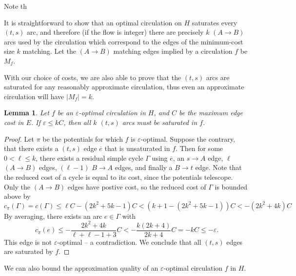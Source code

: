 \documentclass[11pt]{article}
\def\eps{\varepsilon}
\theoremstyle{plain}
\newtheorem{lemma}{Lemma}
\begin{document}
Note th

It is straightforward to show that an optimal circulation on $H$ saturates 
every $(t, s)$ arc, and therefore (if the flow is integer) there are precisely
$k$ $(A \to B)$ arcs used by the circulation which correspond to the edges
of the minimum-cost size $k$ matching.
Let the $(A \to B)$ matching edges implied by a circulation $f$ be $M_f$.

With our choice of costs, we are also able to prove that the $(t, s)$ arcs are
saturated for any reasonably approximate circulation, thus even an approximate
circulation will have $|M_f| = k$.

\begin{lemma}
\label{lemma:ts_saturated}
	Let $f$ be an $\eps$-optimal circulation in $H$, and $C$ be the maximum 
	edge cost in $E$.
	If $\eps \leq kC$, then all $k$ $(t, s)$ arcs must be saturated in $f$.
\end{lemma}
\begin{proof}
	Let $\pi$ be the potentials for which $f$ is $\eps$-optimal.
	Suppose the contrary, that there exists a $(t, s)$ edge $\overline{e}$ 
	that is unsaturated in $f$.
	Then for some $0 < \ell \leq k$, there exists a residual simple cycle 
	$\Gamma$ using $\overline{e}$, an $s \to A$ edge, 
	$\ell$ $(A \to B)$ edges, $(\ell-1)$ $B \to A$ edges, and finally a 
	$B \to t$ edge.
	Note that the reduced cost of a cycle is equal to its cost, since the 
	potentials telescope.
	Only the $(A \to B)$ edges have postive cost, 
	so the reduced cost of $\Gamma$ is bounded above by
	\begin{equation*}
		c_\pi(\Gamma) = c(\Gamma) 
			\leq \ell C - (2k^2 + 5k - 1)C 
			< (k+1 - (2k^2 + 5k - 1))C 
			< - (2k^2 + 4k) C
	\end{equation*}
	By averaging, there exists an arc $e \in \Gamma$ with
	\begin{equation*}
		c_\pi(e) \leq -\frac{2k^2 + 4k}{\ell + \ell-1 + 3} C
			< -\frac{k(2k + 4)}{2k + 4} C
			= -kC
			\leq -\eps.
	\end{equation*}
	This edge is not $\eps$-optimal -- a contradiction.
	We conclude that all $(t, s)$ edges are saturated by $f$.
\end{proof}

We can also bound the approximation quality of an $\eps$-optimal circulation 
$f$ in $H$.
\end{document}
